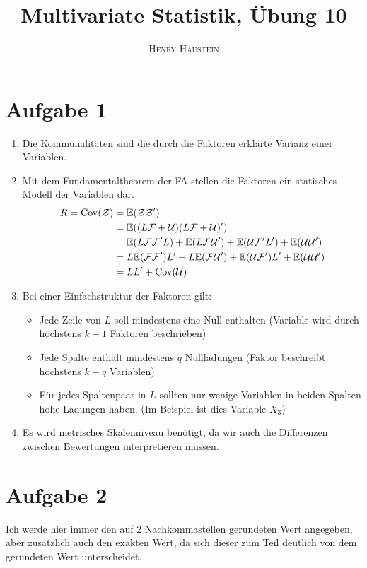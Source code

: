 \documentclass{article}
\title{\textbf{Multivariate Statistik, Übung 10}}
\author{\textsc{Henry Haustein}}
\date{}
\newcommand{\E}{\mathbb{E}}
\DeclareMathOperator{\Cov}{Cov}
\renewcommand{\E}{\mathbb{E}}
\begin{document}
	\maketitle
	
	\section*{Aufgabe 1}
	\begin{enumerate}[label=(\alph*)]
		\item Die Kommunalitäten sind die durch die Faktoren erklärte Varianz einer Variablen.
		\item Mit dem Fundamentaltheorem der FA stellen die Faktoren ein statisches Modell der Variablen dar.
		\begin{align}
			R = \Cov(\mathcal{Z}) &= \E(\mathcal{Z}\mathcal{Z}') \notag \\
			&= \E((L\mathcal{F}+\mathcal{U})(L\mathcal{F}+\mathcal{U})') \notag \\
			&= \E(L\mathcal{F}\mathcal{F}'L) + \E(L\mathcal{F}\mathcal{U}') + \E(\mathcal{U}\mathcal{F}'L') + \E(\mathcal{U}\mathcal{U}') \notag \\
			\label{fundamentaltheoremFA}
			&= L\E(\mathcal{F}\mathcal{F}')L' + L\E(\mathcal{F}\mathcal{U}') + \E(\mathcal{U}\mathcal{F}')L' + \E(\mathcal{U}\mathcal{U}') \notag \\
			&= LL' + \Cov(\mathcal{U}) \notag
		\end{align}
		\item Bei einer Einfachstruktur der Faktoren gilt:
		\begin{itemize}
			\item Jede Zeile von $L$ soll mindestens eine Null enthalten (Variable wird durch höchstens $k - 1$ Faktoren beschrieben)
			\item Jede Spalte enthält mindestens $q$ Nullladungen (Faktor beschreibt höchstens $k - q$ Variablen)
			\item Für jedes Spaltenpaar in $L$ sollten nur wenige Variablen in beiden Spalten hohe Ladungen haben. (Im Beispiel ist dies Variable $X_3$)
		\end{itemize}
		\item Es wird metrisches Skalenniveau benötigt, da wir auch die Differenzen zwischen Bewertungen interpretieren müssen.
	\end{enumerate}

	\section*{Aufgabe 2}
	Ich werde hier immer den auf 2 Nachkommastellen gerundeten Wert angegeben, aber zusätzlich auch den exakten Wert, da sich dieser zum Teil deutlich von dem gerundeten Wert unterscheidet.
	
\end{document}
